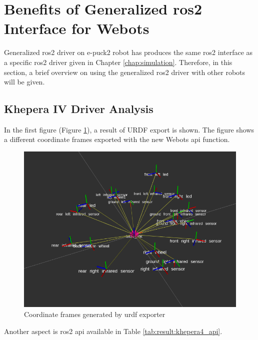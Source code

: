 \section{Benefits of Generalized \ac{ros2} Interface for Webots}

Generalized \ac{ros2} driver on e-puck2 robot has produces the same \ac{ros2} interface as a specific \ac{ros2} driver given in Chapter \ref{chap:simulation}.
Therefore, in this section, a brief overview on using the generalized \ac{ros2} driver with other robots will be given.

\subsection{Khepera IV Driver Analysis}

In the first figure (Figure \ref{fig:results:khepera4_transforms}), a result of URDF export is shown.
The figure shows a different coordinate frames exported with the new Webots \ac{api} function.

\begin{figure}[H]
    \centering
    \includegraphics[width=1\textwidth]{./results/figures/khepera4_transforms}
    \caption{Coordinate frames generated by \ac{urdf} exporter}
    \label{fig:results:khepera4_transforms}
\end{figure}

Another aspect is \ac{ros2} \ac{api} available in Table \ref{tab:result:khepera4_api}.

